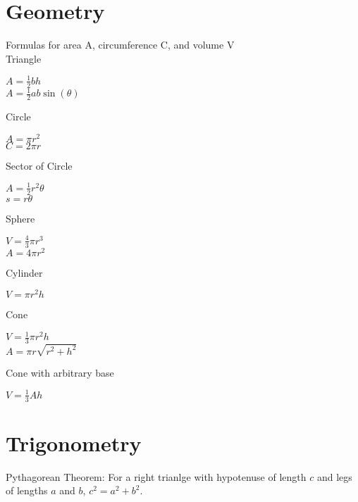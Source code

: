 \documentclass{article}
\begin{document}
\section* {Geometry}
	Formulas for area A, circumference C, and volume V\\
	Triangle\\
		\begin{center}
		$A = \frac{1}{2}bh$\\
		\vspace{10pt}
		$A = \frac{1}{2}ab\sin(\theta)$\\
		\end{center}
	Circle\\
		\begin{center}
		$A = \pi r^2$\\
		\vspace{10pt}
		$C = 2\pi r$\\
		\end{center}
	Sector of Circle\\
		\begin{center}
		$A = \frac{1}{2}r^2\theta$\\
		\vspace{10pt}
		$s = r\theta$\\
		\end{center}
	Sphere\\
		\begin{center}
		$V = \frac{4}{3}\pi r^3$\\
		\vspace{10pt}
		$A = 4\pi r^2$\\
		\end{center}
	Cylinder\\
		\begin{center}
		$V = \pi r^2h$\\
		\end{center}
	Cone\\
		\begin{center}
		$V = \frac{1}{3}\pi r^2h$\\
		\vspace{10pt}
		$A = \pi r\sqrt{r^2 + h^2}$\\
		\end{center}
	Cone with arbitrary base\\
		\begin{center}
		$V = \frac{1}{3}Ah$\\
		\end{center}
		
\section* {Trigonometry}
	Pythagorean Theorem: For a right trianlge with hypotenuse of length $c$ and legs of lengths $a$ and $b$, $c^2 = a^2 + b^2$.\\
\end{document}
